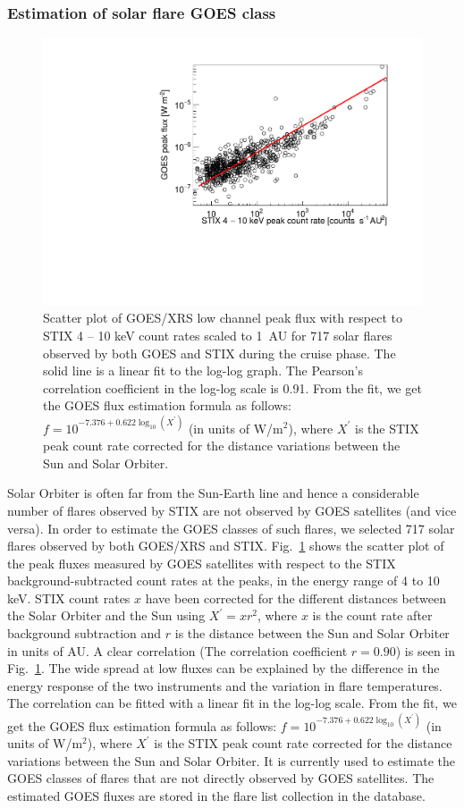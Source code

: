 \documentclass[referee]{aa} %
\begin{document}
\subsubsection{Estimation of solar flare GOES class }
\begin{figure}
  \centering
  \includegraphics[width=0.8\linewidth]{figures/goes_stix_flux_paper.pdf}
  \caption{Scatter plot of GOES/XRS low channel peak flux with respect to STIX 4 -- 10 keV count rates scaled to 1~AU for 717 solar flares observed by both GOES and STIX during the cruise phase.   The solid line is a linear fit to the log-log graph.  The Pearson’s correlation coefficient  in the log-log scale is 0.91.   From the fit, we get the GOES flux estimation formula as follows: 
$f = 10^{-7.376+0.622 \log_{10} (X^{'})}$ (in units of W/m$^2$), where $X^{'}$ is the STIX peak count rate corrected for the distance variations between the Sun and Solar Orbiter. 
  }
\label{fig:goes-stix}
\end{figure}
Solar Orbiter is often far from the Sun-Earth line and hence a considerable number of flares observed by STIX 
are not observed by GOES satellites (and vice versa). 
In order to estimate the GOES classes of such flares,  we selected 717 solar flares observed by both GOES/XRS and STIX. 
Fig.~\ref{fig:goes-stix} shows the scatter plot of the peak fluxes
measured by GOES satellites with respect to the STIX background-subtracted count rates at the peaks, 
 in the energy range of 4 to 10 keV. 
STIX count rates $x$ have been corrected for 
the different distances between the Solar Orbiter and the Sun using $X^{'}=x r^2$,
where $x$ is the count rate after background subtraction
 and $r$ is the distance between the Sun and Solar Orbiter in units of AU.  A clear correlation (The correlation coefficient $r=0.90$) is seen in Fig.~\ref{fig:goes-stix}.  The wide spread at low fluxes can be explained by the difference in 
the energy response of the two instruments and the variation in flare temperatures. 
The correlation can be fitted with a linear fit in the log-log scale. 
From the fit, we get the GOES flux estimation formula as follows: 
$f = 10^{-7.376+0.622 \log_{10} (X^{'})}$ (in units of W/m$^2$), where $X^{'}$ is the STIX peak count rate corrected for the distance variations between the Sun and Solar Orbiter. It is currently used to estimate the GOES classes of flares that are not directly observed by GOES satellites.  The estimated GOES fluxes are stored in the flare list collection in the database. 
\end{document}
